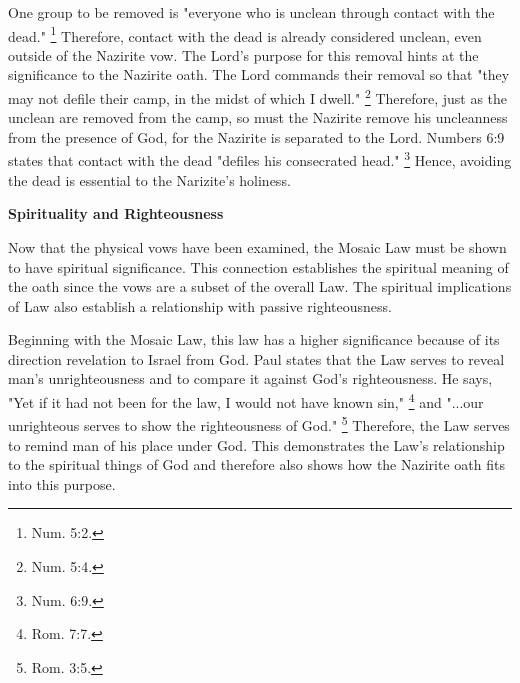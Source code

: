 \documentclass[12pt]{turabian-researchpaper}
\begin{document}
One group to be removed is "everyone who is unclean through contact with the dead." \footnote{Num. 5:2.}
Therefore, contact with the dead is already considered unclean, even outside of the Nazirite vow. 
The Lord's purpose for this removal hints at the significance to the Nazirite oath.
The Lord commands their removal so that "they may not defile their camp, in the midst of which I dwell." \footnote{Num. 5:4.} 
Therefore, just as the unclean are removed from the camp, so must the Nazirite remove his uncleanness from the presence of God, for the Nazirite is separated to the Lord.
Numbers 6:9 states that contact with the dead "defiles his consecrated head." \footnote{Num. 6:9.} 
Hence, avoiding the dead is essential to the Narizite's holiness. 

 \pagebreak

\begin{center}
\textbf{Spirituality and Righteousness}
\end{center}

\par
Now that the physical vows have been examined, the Mosaic Law must be shown to have spiritual significance. 
This connection establishes the spiritual meaning of the oath since the vows are a subset of the overall Law. 
The spiritual implications of Law also establish a relationship with passive righteousness.

\par
Beginning with the Mosaic Law, this law has a higher significance because of its direction revelation to Israel from God.
Paul states that the Law serves to reveal man's unrighteousness and to compare it against God's righteousness.
He says, "Yet if it had not been for the law, I would not have known sin," \footnote{Rom. 7:7.} and "...our unrighteous serves to show the righteousness of God." \footnote{Rom. 3:5.}
Therefore, the Law serves to remind man of his place under God. 
This demonstrates the Law's relationship to the spiritual things of God and therefore also shows how the Nazirite oath fits into this purpose.
\end{document}

